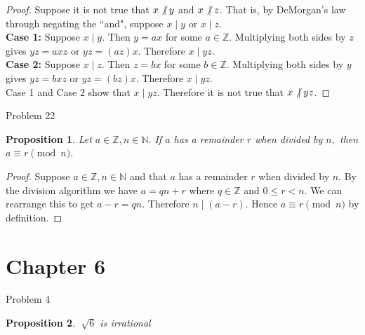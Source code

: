 \documentclass[12pt,letterpaper, onecolumn]{exam}
\newtheorem*{prop}{Proposition}
\newcommand{\doesnotdivide}{\not\hspace{2.5pt}\mid}
\begin{document}
	\begin{proof}
		Suppose it is not true that $x\doesnotdivide y$ and $x\doesnotdivide z$. That is, by DeMorgan's law through negating the ``and", suppose $x\mid y$ or $x\mid z$.\\
		\textbf{Case 1: }Suppose $x\mid y$. Then $y=ax$ for some $a\in\mathbb{Z}$. Multiplying both sides by $z$ gives $yz=axz$ or $yz=(az)x$. Therefore $x\mid yz$.\\
		\textbf{Case 2: }Suppose $x\mid z$. Then $z=bx$ for some $b\in\mathbb{Z}$. Multiplying both sides by $y$ gives $yz=bxz$ or $yz=(bz)x$. Therefore $x\mid yz$.\\
		Case 1 and Case 2 show that $x\mid yz$. Therefore it is not true that $x\doesnotdivide yz$.
	\end{proof}
		\centerline{Problem 22}
	\begin{prop}
		Let $a\in \mathbb{Z}, n\in \mathbb{N}.$ If $a$ has a remainder $r$ when divided by $n,$ then $a\equiv r \pmod n$.
	\end{prop}
	
	\begin{proof}
		Suppose $a\in \mathbb{Z}, n\in \mathbb{N}$ and that $a$ has a remainder $r$ when divided by $n$. By the division algorithm we have $a=qn+r$ where $q\in\mathbb{Z}$ and $0\leq r <n$. We can rearrange this to get $a-r=qn$. Therefore $n\mid (a-r)$. Hence  $a\equiv r \pmod n$ by definition.
	\end{proof}
	
	\section{Chapter 6}
	
	\centerline{Problem 4}
	\begin{prop}
		$\sqrt[]{6}$ is irrational
	\end{prop}
	
\end{document}
